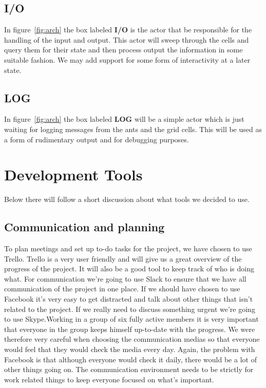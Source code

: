 \documentclass[a4paper]{article}
\begin{document}
\subsection{I/O}
In figure~\ref{fig:arch} the box labeled \textbf{I/O} is the actor that be
responsible for the handling of the input and output. This actor will sweep through the cells and
query them for their state and then process output the information in some
suitable fashion. We may add support for some form of interactivity at a later
state.

\subsection{LOG}
In figure~\ref{fig:arch} the box labeled \textbf{LOG} will be a simple actor which
is just waiting for logging messages from the ants and the grid cells. This will be
used as a form of rudimentary output and for debugging purposes.


\section{Development Tools}
Below there will follow a short discussion about what tools we decided to use.
\subsection{Communication and planning}
To plan meetings and set up to-do tasks
for the project, we have chosen to use Trello. Trello is a very user friendly and will
give us a great overview of the progress of the project. It will also be a good
tool to keep track of who is doing what. For communication we’re going to use
Slack to ensure that we have all communication of the project in one place. If
we should have chosen to use Facebook it’s very easy to get distracted and talk
about other things that isn't related to the project. If we really need to discuss
something urgent we’re going to use Skype.Working in a group of six fully active members
it is very important that everyone in the group keeps himself up-to-date with the progress. 
We were therefore very careful when choosing the communication medias so that everyone would
feel that they would check the media every day. Again, the problem with Facebook is that 
although everyone would check it daily, there would be a lot of other things going on.
The communication environment needs to be strictly for work related things to keep everyone
focused on what's important.
\end{document}
